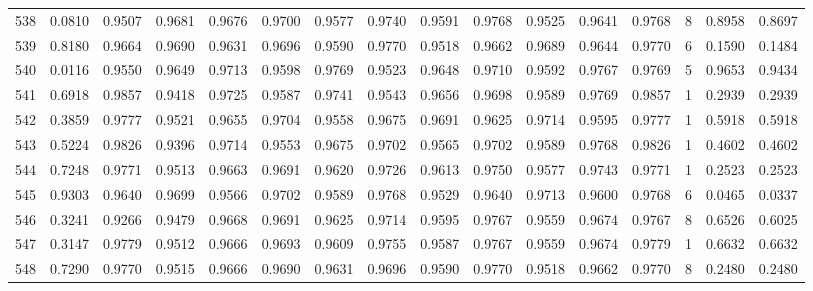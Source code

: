 \begin{tabular}{lrrrrrrrrrrrrrrr}
538 &      0.0810 &  0.9507 &  0.9681 &  0.9676 &  0.9700 &  0.9577 &  0.9740 &  0.9591 &  0.9768 &  0.9525 &   0.9641 &     0.9768 &      8 &                    0.8958 &                     0.8697 \\
539 &      0.8180 &  0.9664 &  0.9690 &  0.9631 &  0.9696 &  0.9590 &  0.9770 &  0.9518 &  0.9662 &  0.9689 &   0.9644 &     0.9770 &      6 &                    0.1590 &                     0.1484 \\
540 &      0.0116 &  0.9550 &  0.9649 &  0.9713 &  0.9598 &  0.9769 &  0.9523 &  0.9648 &  0.9710 &  0.9592 &   0.9767 &     0.9769 &      5 &                    0.9653 &                     0.9434 \\
541 &      0.6918 &  0.9857 &  0.9418 &  0.9725 &  0.9587 &  0.9741 &  0.9543 &  0.9656 &  0.9698 &  0.9589 &   0.9769 &     0.9857 &      1 &                    0.2939 &                     0.2939 \\
542 &      0.3859 &  0.9777 &  0.9521 &  0.9655 &  0.9704 &  0.9558 &  0.9675 &  0.9691 &  0.9625 &  0.9714 &   0.9595 &     0.9777 &      1 &                    0.5918 &                     0.5918 \\
543 &      0.5224 &  0.9826 &  0.9396 &  0.9714 &  0.9553 &  0.9675 &  0.9702 &  0.9565 &  0.9702 &  0.9589 &   0.9768 &     0.9826 &      1 &                    0.4602 &                     0.4602 \\
544 &      0.7248 &  0.9771 &  0.9513 &  0.9663 &  0.9691 &  0.9620 &  0.9726 &  0.9613 &  0.9750 &  0.9577 &   0.9743 &     0.9771 &      1 &                    0.2523 &                     0.2523 \\
545 &      0.9303 &  0.9640 &  0.9699 &  0.9566 &  0.9702 &  0.9589 &  0.9768 &  0.9529 &  0.9640 &  0.9713 &   0.9600 &     0.9768 &      6 &                    0.0465 &                     0.0337 \\
546 &      0.3241 &  0.9266 &  0.9479 &  0.9668 &  0.9691 &  0.9625 &  0.9714 &  0.9595 &  0.9767 &  0.9559 &   0.9674 &     0.9767 &      8 &                    0.6526 &                     0.6025 \\
547 &      0.3147 &  0.9779 &  0.9512 &  0.9666 &  0.9693 &  0.9609 &  0.9755 &  0.9587 &  0.9767 &  0.9559 &   0.9674 &     0.9779 &      1 &                    0.6632 &                     0.6632 \\
548 &      0.7290 &  0.9770 &  0.9515 &  0.9666 &  0.9690 &  0.9631 &  0.9696 &  0.9590 &  0.9770 &  0.9518 &   0.9662 &     0.9770 &      8 &                    0.2480 &                     0.2480 \\

\end{tabular}
